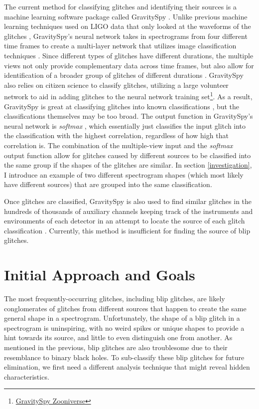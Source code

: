 \documentclass[a4paper]{article}
\begin{document}
The current method for classifying glitches and identifying their sources is a machine learning software package called GravitySpy \cite{Zevin:2016}. Unlike previous machine learning techniques used on LIGO data that only looked at the waveforms of the glitches \cite{Mukherjee:2010}, GravitySpy's neural network takes in spectrograms from four different time frames to create a multi-layer network that utilizes image classification techniques \cite{Bahaadini:2017}. Since different types of glitches have different durations, the multiple views not only provide complementary data across time frames, but also allow for identification of a broader group of glitches of different durations \cite{Bahaadini:2017}. GravitySpy also relies on citizen science to classify glitches, utilizing a large volunteer network to aid in adding glitches to the neural network training set\footnote{\href{https://www.zooniverse.org/projects/zooniverse/gravity-spy}{GravitySpy Zooniverse}}. As a result, GravitySpy is great at classifying glitches into known classifications \cite{Zevin:2016}, but the classifications themselves may be too broad. The output function in GravitySpy's neural network is \textit{softmax} \cite{Bahaadini:2017}, which essentially just classifies the input glitch into the classification with the highest correlation, regardless of how high that correlation is. The combination of the multiple-view input and the \textit{softmax} output function allow for glitches caused by different sources to be classified into the same group if the shapes of the glitches are similar. In section \ref{investigation}, I introduce an example of two different spectrogram shapes (which most likely have different sources) that are grouped into the same classification. 

Once glitches are classified, GravitySpy is also used to find similar glitches in the hundreds of thousands of auxiliary channels keeping track of the instruments and environments of each detector in an attempt to locate the source of each glitch classification \cite{Zevin:2016}. Currently, this method is insufficient for finding the source of blip glitches.

\section{Initial Approach and Goals} \label{goal}

The most frequently-occurring glitches, including blip glitches, are likely conglomerates of glitches from different sources that happen to create the same general shape in a spectrogram. Unfortunately, the shape of a blip glitch in a spectrogram is uninspiring, with no weird spikes or unique shapes to provide a hint towards its source, and little to even distinguish one from another. As mentioned in the previous, blip glitches are also troublesome due to their resemblance to binary black holes. To sub-classify these blip glitches for future elimination, we first need a different analysis technique that might reveal hidden characteristics. 
\end{document}
